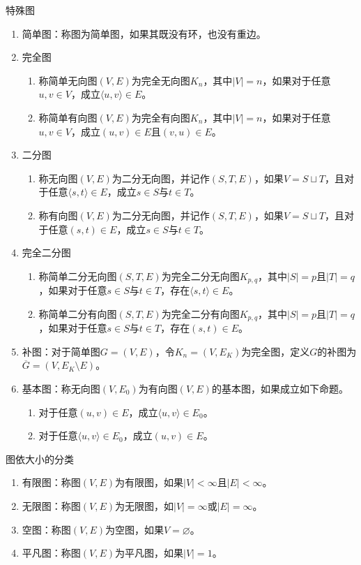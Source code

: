 \documentclass[lang = cn, scheme = chinese, thmcnt = section]{elegantbook}
\begin{document}
\begin{definition}{特殊图}
	\begin{enumerate}
		\item 简单图：称图为简单图，如果其既没有环，也没有重边。
		\item 完全图
		\begin{enumerate}
			\item 称简单无向图$(V,E)$为完全无向图$K_n$，其中$|V|=n$，如果对于任意$u,v\in V$，成立$\langle u,v \rangle\in E$。
			\item 称简单有向图$(V,E)$为完全有向图$K_n$，其中$|V|=n$，如果对于任意$u,v\in V$，成立$(u,v)\in E$且$(v,u)\in E$。
		\end{enumerate}
		\item 二分图
		\begin{enumerate}
			\item 称无向图$(V,E)$为二分无向图，并记作$(S,T,E)$，如果$V=S\sqcup T$，且对于任意$\langle s,t \rangle\in E$，成立$s\in S$与$t\in T$。
			\item 称有向图$(V,E)$为二分无向图，并记作$(S,T,E)$，如果$V=S\sqcup T$，且对于任意$(s,t)\in E$，成立$s\in S$与$t\in T$。
		\end{enumerate}
		\item 完全二分图
		\begin{enumerate}
			\item 称简单二分无向图$(S,T,E)$为完全二分无向图$K_{p,q}$，其中$|S|=p$且$|T|=q$，如果对于任意$s\in S$与$t\in T$，存在$\langle s,t \rangle\in E$。
			\item 称简单二分有向图$(S,T,E)$为完全二分有向图$K_{p,q}$，其中$|S|=p$且$|T|=q$，如果对于任意$s\in S$与$t\in T$，存在$(s,t)\in E$。
		\end{enumerate}
		\item 补图：对于简单图$G=(V,E)$，令$K_n=(V,E_K)$为完全图，定义$G$的补图为$\overline{G}=(V,E_K\setminus E)$。
		\item 基本图：称无向图$(V,E_0)$为有向图$(V,E)$的基本图，如果成立如下命题。
		\begin{enumerate}
			\item 对于任意$(u,v)\in E$，成立$\langle u,v \rangle\in E_0$。
			\item 对于任意$\langle u,v \rangle\in E_0$，成立$(u,v)\in E$。
		\end{enumerate}
	\end{enumerate}
\end{definition}

\begin{definition}{图依大小的分类}
	\begin{enumerate}
		\item 有限图：称图$(V,E)$为有限图，如果$|V|<\infty$且$|E|<\infty$。
		\item 无限图：称图$(V,E)$为无限图，如$|V|=\infty$或$|E|=\infty$。
		\item 空图：称图$(V,E)$为空图，如果$V=\varnothing$。
		\item 平凡图：称图$(V,E)$为平凡图，如果$|V|=1$。
	\end{enumerate}
\end{definition}
\end{document}

